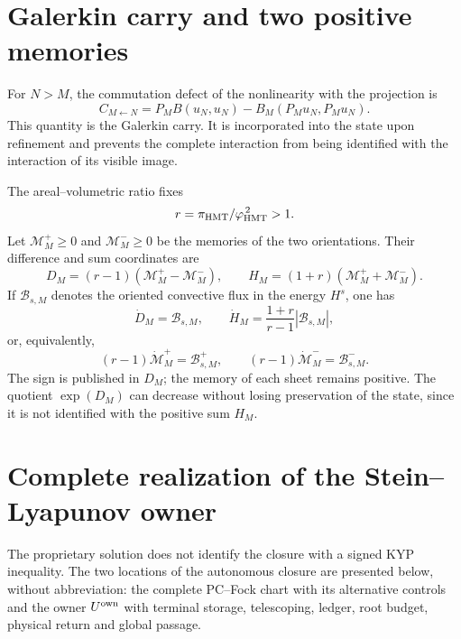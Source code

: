 \section*{Galerkin carry and two positive memories}

For \(N>M\), the commutation defect of the nonlinearity with the
projection is
\begin{equation}\label{eq:realizaciones-ns-acarreo}
 C_{M\leftarrow N}
 =P_MB(u_N,u_N)-B_M(P_Mu_N,P_Mu_N).
\end{equation}
This quantity is the Galerkin carry. It is incorporated into the state upon refinement and
prevents the complete interaction from being identified with the interaction of its visible
image.

The areal--volumetric ratio fixes
\begin{equation}\label{eq:realizaciones-ns-r}
 r=\frac{\pi_{\rm HMT}}{\varphi_{\rm HMT}^{\,2}}>1.
\end{equation}
Let \(\mathcal M_M^+\geq0\) and \(\mathcal M_M^-\geq0\) be the memories of the two orientations.
Their difference and sum coordinates are
\begin{equation}\label{eq:realizaciones-ns-dh}
 D_M=(r-1)(\mathcal M_M^+-\mathcal M_M^-),
 \qquad
 H_M=(1+r)(\mathcal M_M^++\mathcal M_M^-).
\end{equation}
If \(\mathcal B_{s,M}\) denotes the oriented convective flux in the energy
\(H^s\), one has
\begin{equation}\label{eq:realizaciones-ns-dh-derivadas}
 \dot D_M=\mathcal B_{s,M},
 \qquad
 \dot H_M=\frac{1+r}{r-1}|\mathcal B_{s,M}|,
\end{equation}
or, equivalently,
\begin{equation}\label{eq:realizaciones-ns-memorias-positivas}
 (r-1)\dot{\mathcal M}_M^+=\mathcal B_{s,M}^{+},
 \qquad
 (r-1)\dot{\mathcal M}_M^-=\mathcal B_{s,M}^{-}.
\end{equation}
The sign is published in \(D_M\); the memory of each sheet remains positive.
The quotient \(\exp(D_M)\) can decrease without losing preservation
of the state, since it is not identified with the positive sum \(H_M\).

\section*{Complete realization of the Stein--Lyapunov owner}

The proprietary solution does not identify the closure with a signed KYP
inequality. The two locations of the autonomous closure are presented below,
without abbreviation: the complete PC--Fock chart with its alternative
controls and the owner \(U^{\rm own}\) with terminal storage,
telescoping, ledger, root budget, physical return and global passage.

